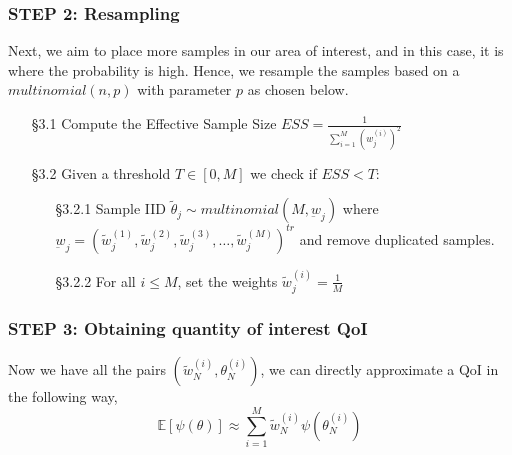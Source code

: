 \documentclass[aspectratio=169]{beamer}\usepackage[utf8]{inputenc}
\newcommand{\E}{\mathbb{E}}
\begin{document}
\begin{frame}\frametitle{STEP 2: Resampling  }
Next,  we aim to place more samples in our area of interest, and in this case, it is  where the  probability is high. Hence, we resample the samples  based on a $multinomial(n,p)$  with parameter $p$ as chosen below.\\
\begin{enumerate}
\item[§3.1] Compute the Effective Sample Size $ESS= \frac{1}{\sum_{i=1}^M (w^{(i)}_j )^2 }$ 
\item [§3.2] Given a threshold $T \in [0,M]$ we check if $ESS < T$: 
\begin{enumerate}
\item[§3.2.1]  Sample IID $\tilde{\theta}_j  \sim  multinomial(M,\underbar{w}_j)$  where $\underbar{w}_j=(\tilde{w}^{(1)}_j , \tilde{w}^{(2)}_j ,\tilde{w}^{(3)}_j ,\ldots, \tilde{w}^{(M)}_j )^{tr} $ and remove duplicated samples.
\item[§3.2.2]  For all $i \leq M$, set the weights $ \tilde{w}_j^{(i)} = \frac{1}{M} $
\end{enumerate}

\end{enumerate}
\end{frame}

\begin{frame}\frametitle{STEP 3: Obtaining quantity of interest  QoI }
Now we have all the pairs $(\tilde{w}_N^{(i)},\theta_N^{(i)} )$, we can directly approximate a  QoI  in the following way, 
\begin{equation}
\E [ \psi (\theta)] \approx \sum_{i=1}^M \tilde{w}_N^{(i)}  \psi (\theta_N^{(i)})
\end{equation}
\end{frame}
\end{document}
